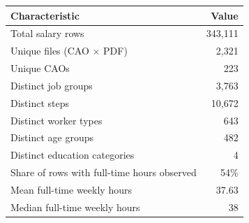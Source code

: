 \begin{tabular}{lr}
    \hline\hline
    Characteristic & Value \\
    \hline
    Total salary rows & 343,111 \\
    Unique files (CAO $\times$ PDF) & 2,321 \\
    Unique CAOs & 223 \\
    Distinct job groups & 3,763 \\
    Distinct steps & 10,672 \\
    Distinct worker types & 643 \\
    Distinct age groups & 482 \\
    Distinct education categories & 4 \\
    Share of rows with full-time hours observed & 54\% \\
    Mean full-time weekly hours & 37.63 \\
    Median full-time weekly hours & 38 \\
    \hline\hline
\end{tabular}
